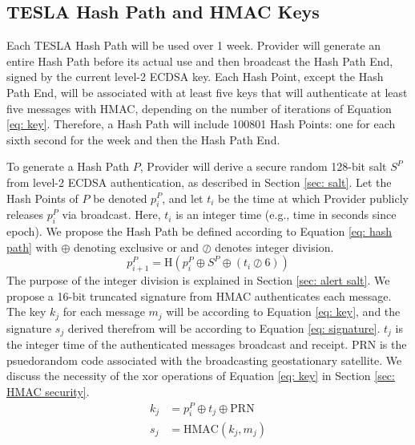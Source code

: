 \documentclass[letterpaper,times]{IONconf/IONconf}
\begin{document}
\subsection{TESLA Hash Path and HMAC Keys} \label{sec: TESLA Hash Path and HMAC Keys}

Each TESLA Hash Path will be used over 1 week.
Provider will generate an entire Hash Path before its actual use and then broadcast the Hash Path End, signed by the current level-2 ECDSA key.
Each Hash Point, except the Hash Path End, will be associated with at least five keys that will authenticate at least five messages with HMAC, depending on the number of iterations of Equation \ref{eq: key}.
Therefore, a Hash Path will include 100801 Hash Points: one for each sixth second for the week and then the Hash Path End.

To generate a Hash Path $P$, Provider will derive a secure random 128-bit salt $S^P$ from level-2 ECDSA authentication, as described in Section \ref{sec: salt}.
Let the Hash Points of $P$ be denoted $p^P_i$, and let $t_i$ be the time at which Provider publicly releases $p^P_i$ via broadcast.
Here, $t_i$ is an integer time (e.g., time in seconds since epoch).
We propose the Hash Path be defined according to Equation \eqref{eq: hash path} with $\oplus$ denoting exclusive or and $\oslash$ denotes integer division.
\begin{equation}\label{eq: hash path}
p^P_{i+1} = \textrm{H} \left(p^P_i \oplus S^P \oplus (t_i \oslash 6) \right)
\end{equation}
The purpose of the integer division is explained in Section \ref{sec: alert salt}.
We propose a 16-bit truncated signature from HMAC authenticates each message.
The key $k_j$ for each message $m_j$ will be according to Equation \ref{eq: key}, and the signature $s_j$ derived therefrom will be according to Equation \eqref{eq: signature}.
$t_j$ is the integer time of the authenticated messages broadcast and receipt.
PRN is the psuedorandom code associated with the broadcasting geostationary satellite.
We discuss the necessity of the xor operations of Equation \eqref{eq: key} in Section \ref{sec: HMAC security}.
\begin{align} 
k_j &= p^P_i \oplus t_j \oplus \textrm{PRN} \label{eq: key} \\
s_j &= \textrm{HMAC}(k_j, m_j) \label{eq: signature}
\end{align}
\end{document}
